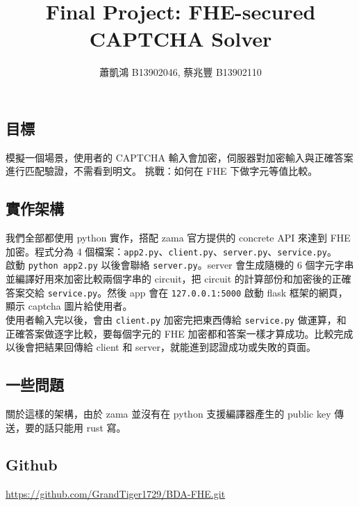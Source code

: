 \documentclass[12pt,a4paper]{article}
\title{Final Project: FHE-secured CAPTCHA Solver}
\author{蕭凱鴻 B13902046, 蔡兆豐 B13902110}
\date{}
\begin{document}
\maketitle

\subsection{目標}

模擬一個場景，使用者的 CAPTCHA 輸入會加密，伺服器對加密輸入與正確答案進行匹配驗證，不需看到明文。
挑戰：如何在 FHE 下做字元等值比較。

\subsection{實作架構}

我們全部都使用 python 實作，搭配 zama 官方提供的 concrete API 來達到 FHE 加密。程式分為 4 個檔案：\verb|app2.py|、\verb|client.py|、\verb|server.py|、\verb|service.py|。\\

啟動 \verb|python app2.py| 以後會聯絡 \verb|server.py|。server 會生成隨機的 6 個字元字串並編譯好用來加密比較兩個字串的 circuit，把 circuit 的計算部份和加密後的正確答案交給 \verb|service.py|。然後 app 會在 \verb|127.0.0.1:5000| 啟動 flask 框架的網頁，顯示 captcha 圖片給使用者。\\

使用者輸入完以後，會由 \verb|client.py| 加密完把東西傳給 \verb|service.py| 做運算，和正確答案做逐字比較，要每個字元的 FHE 加密都和答案一樣才算成功。比較完成以後會把結果回傳給 client 和 server，就能進到認證成功或失敗的頁面。

\subsection{一些問題}

關於這樣的架構，由於 zama 並沒有在 python 支援編譯器產生的 public key 傳送，要的話只能用 rust 寫。

\subsection{Github}

\url{https://github.com/GrandTiger1729/BDA-FHE.git}
\end{document}

